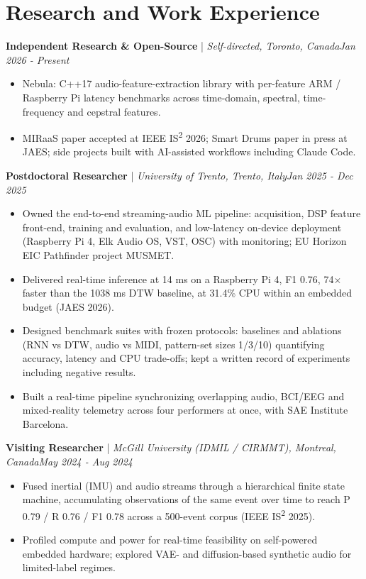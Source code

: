 \documentclass[11pt]{article}
\newenvironment{cvrole}[5]{%
  \par\noindent\textbf{\large #1} | \textit{\small #2, #3}\hfill \textit{\small #4 - #5}\par
  \begin{itemize}[leftmargin=2em, itemsep=-0.3em, topsep=-0.5em]%
}{%
  \end{itemize}\par\noindent\mbox{}\par\vspace{0.1em}%
}
\begin{document}
\section*{Research and Work Experience}

\begin{cvrole}{Independent Research \& Open-Source}{Self-directed}{Toronto, Canada}{Jan 2026}{Present}
    \item Nebula: C++17 audio-feature-extraction library with per-feature ARM / Raspberry Pi latency benchmarks across time-domain, spectral, time-frequency and cepstral features.
    \item MIRaaS paper accepted at IEEE IS\textsuperscript{2} 2026; Smart Drums paper in press at JAES; side projects built with AI-assisted workflows including Claude Code.
\end{cvrole}

\begin{cvrole}{Postdoctoral Researcher}{University of Trento}{Trento, Italy}{Jan 2025}{Dec 2025}
    \item Owned the end-to-end streaming-audio ML pipeline: acquisition, DSP feature front-end, training and evaluation, and low-latency on-device deployment (Raspberry Pi 4, Elk Audio OS, VST, OSC) with monitoring; EU Horizon EIC Pathfinder project MUSMET.
    \item Delivered real-time inference at 14 ms on a Raspberry Pi 4, F1 0.76, 74$\times$ faster than the 1038 ms DTW baseline, at 31.4\% CPU within an embedded budget (JAES 2026).
    \item Designed benchmark suites with frozen protocols: baselines and ablations (RNN vs DTW, audio vs MIDI, pattern-set sizes 1/3/10) quantifying accuracy, latency and CPU trade-offs; kept a written record of experiments including negative results.
    \item Built a real-time pipeline synchronizing overlapping audio, BCI/EEG and mixed-reality telemetry across four performers at once, with SAE Institute Barcelona.
\end{cvrole}

\begin{cvrole}{Visiting Researcher}{McGill University (IDMIL / CIRMMT)}{Montreal, Canada}{May 2024}{Aug 2024}
    \item Fused inertial (IMU) and audio streams through a hierarchical finite state machine, accumulating observations of the same event over time to reach P 0.79 / R 0.76 / F1 0.78 across a 500-event corpus (IEEE IS\textsuperscript{2} 2025).
    \item Profiled compute and power for real-time feasibility on self-powered embedded hardware; explored VAE- and diffusion-based synthetic audio for limited-label regimes.
\end{cvrole}
\end{document}
